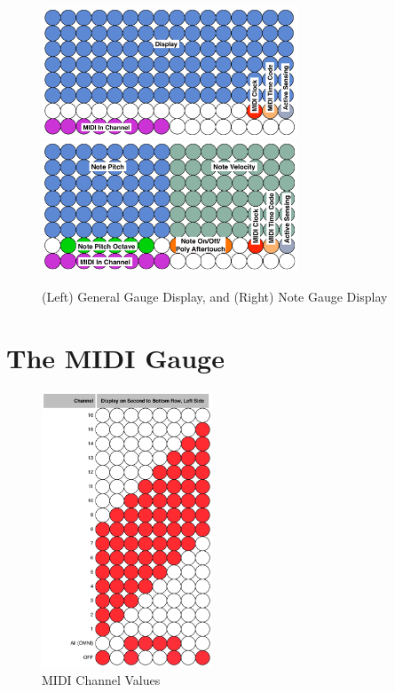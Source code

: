 \documentclass{article}
\begin{document}
\vspace{2em}
\begin{figure}[h!]
\begin{center}
\includegraphics[width=3in]{GeneralGauge.pdf}~\includegraphics[width=3in]{NoteGauge.pdf}
\caption{\small (Left) General Gauge Display, and (Right) Note Gauge Display}
\label{gaugedisplays} \end{center}
\vspace{-3em}\end{figure}


\section {The MIDI Gauge}


\begin{figure}
\vspace{-1.5em}\includegraphics[width=2in]{midichannel.pdf}
\vspace{-2em}\caption{\small MIDI Channel Values}
\label{midichannelvalues}
\end{figure}
\end{document}

